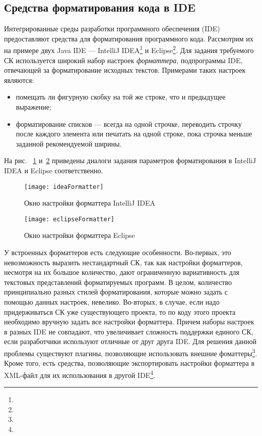 

\newpage
\subsection{Средства форматирования кода в IDE}

Интегрированные среды разработки программного обеспечения
(IDE) предоставляют средства
для форматирования программного кода. Рассмотрим их на примере двух Java IDE ---
IntelliJ IDEA\footnote{} и
Eclipse\footnote{}.
Для задания требуемого СК используется широкий набор настроек \emph{форматтера},
подпрограммы IDE, отвечающей за форматирование исходных текстов.
Примерами таких настроек являются:
\begin{itemize}
  \item помещать ли фигурную скобку на той же строке, что и
    предыдущее выражение;
  \item форматирование списков --- всегда на одной строчке, переводить строчку после
    каждого элемента или печатать на одной строке,
    пока строчка меньше заданной рекомендуемой ширины.
\end{itemize}
На рис. ~\ref{fig:ideaFormatter} и~\ref{fig:eclipseFormatter} приведены диалоги задания
параметров форматирования в IntelliJ IDEA и Eclipse соответственно.

\begin{figure}[p]
	\centering
	\texttt{[image: ideaFormatter]}
	\caption{Окно настройки форматтера IntelliJ IDEA}
	\label{fig:ideaFormatter}
\end{figure}

\begin{figure}[p]
	\centering
	\texttt{[image: eclipseFormatter]}
	\caption{Окно настройки форматтера Eclipse}
	\label{fig:eclipseFormatter}
\end{figure}

У встроенных форматтеров есть следующие особенности.
Во-первых, это невозможность выразить
нестандартный СК, так как настройки форматтеров, несмотря на их большое
количество,
дают ограниченную вариативность для текстовых представлений форматируемых
программ. В целом, количество принципиально разных
стилей форматирования, которые можно задать с помощью данных настроек,
невелико.
Во-вторых, в случае, если надо
придерживаться СК уже существующего проекта, то по коду этого проекта необходимо
вручную задать все настройки форматтера.
Причем наборы настроек в разных IDE не совпадают, что увеличивает сложность
поддержки единого СК, если разработчики используют отличные от друг друга IDE.
Для решения данной проблемы существуют плагины, позволяющие использовать
внешние фоматтеры\footnote{}.
Кроме того, есть средства, позволяющие экспортировать настройки форматтера в
XML-файл для их использования в другой
IDE\footnote{}.

